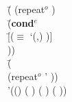 \begin{ZZZZschemedisplay}%
\va{$\gt$} \=( (repeat$^o$  )\\%
  \>\PRN \HL \=(\textbf{cond$^e$}\\%
  \>  \>\PRN \HL \=[($\equiv$ `(,) )]\\%
  \>  \>  \>[\=(\sy{fresh} (\va{res})\\%
  \>  \>  \> \>\PRN \HL \=($\equiv$ `(,\va{x} . ,\va{res}) \va{out})\\%
  \>  \>  \> \>  \>(repeat$^o$ \va{x} \va{res}))]))\\%
\va{$\gt$} \=(  \\%
  \>\PRN \HL (repeat$^o$ '\cn{$\ast$} ))\\%
'((\cn{$\ast$}) (\cn{$\ast$} \cn{$\ast$}) (\cn{$\ast$} \cn{$\ast$} \cn{$\ast$}) (\cn{$\ast$} \cn{$\ast$} \cn{$\ast$} \cn{$\ast$}))%
\end{ZZZZschemedisplay}
